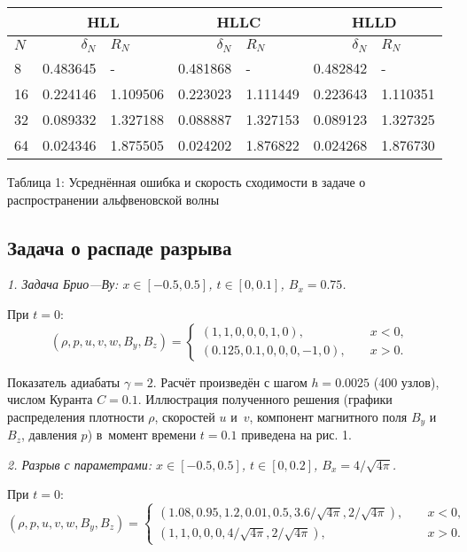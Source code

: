 \documentclass[12pt, a4paper]{article}
\begin{document}
 	\begin{center}
 	\begin{tabular}{|l|r|l|r|l|r|l|}
 		\hline
 		& \multicolumn{2}{c|}{HLL} & \multicolumn{2}{c|}{HLLC} & \multicolumn{2}{c|}{HLLD} \\
 		\hline
 		$N$& $\delta_N$ & $R_N$ & $\delta_N$ & $R_N$ & $\delta_N$ & $R_N$ \\
 		\hline
 		8 & 0.483645 & - & 0.481868 & - & 0.482842 & - \\
 		\hline
 		16 & 0.224146 & 1.109506 & 0.223023 & 1.111449 & 0.223643 & 1.110351 \\
 		\hline
 		32 & 0.089332 & 1.327188 & 0.088887 & 1.327153 & 0.089123 & 1.327325 \\
 		\hline
 		64 & 0.024346 & 1.875505 & 0.024202 & 1.876822 & 0.024268 & 1.876730 \\
 		\hline
 	\end{tabular}
 \vspace*{5mm}
 
 Таблица 1: Усреднённая ошибка и скорость сходимости в задаче о распространении альфвеновской волны	
 \end{center}
 	\subsection{Задача о распаде разрыва}
 	\textsl{1. Задача Брио---Ву: $x \in [-0.5, 0.5]$, $t \in [0, 0.1]$, $B_x = 0.75$.}
 	
 	При $t=0$:
 	\[
 	(\rho, p, u, v, w, B_y, B_z) = \begin{cases}
 		(1, 1, 0,0,0,1,0),  \phantom{xx}&x < 0,\\
 		(0.125, 0.1, 0,0,0,-1,0),  \phantom{xx}&x > 0.
 		\end{cases}
 	\]
 	
 	Показатель адиабаты $\gamma = 2$. Расчёт произведён с шагом $h=0.0025$ (400 узлов), числом Куранта $C=0.1$. Иллюстрация полученного решения (графики распределения плотности $\rho$, скоростей $u$ и~$v$, компонент магнитного поля $B_y$ и $B_z$, давления $p$) в~момент времени $t=0.1$ приведена на рис. 1.
 	
 	\textsl{2. Разрыв с параметрами: $x \in [-0.5, 0.5]$, $t \in [0, 0.2]$, $B_x = 4/\sqrt{4\pi}$.}
 	
 	При $t=0$:
 	\[
 	(\rho, p, u, v, w, B_y, B_z) = \begin{cases}
 		(1.08, 0.95, 1.2, 0.01, 0.5, 3.6/\sqrt{4\pi}, 2/\sqrt{4\pi}),  \phantom{xx}&x < 0,\\
 		(1, 1, 0, 0, 0, 4/\sqrt{4\pi}, 2/\sqrt{4\pi}),  \phantom{xx}&x > 0.
 	\end{cases}
 	\]
 	
\end{document}
